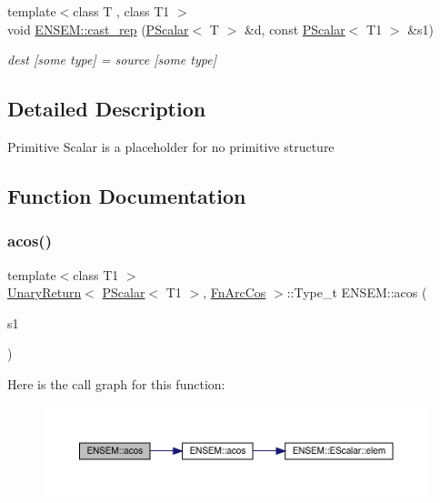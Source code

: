 \begin{DoxyCompactItemize}
{\footnotesize template$<$class T , class T1 $>$ }\\void \mbox{\hyperlink{group__primscalar_ga1444be24a3863d0af7a71b450500cb9d}{E\+N\+S\+E\+M\+::cast\+\_\+rep}} (\mbox{\hyperlink{classENSEM_1_1PScalar}{P\+Scalar}}$<$ T $>$ \&d, const \mbox{\hyperlink{classENSEM_1_1PScalar}{P\+Scalar}}$<$ T1 $>$ \&s1)
\begin{DoxyCompactList}\small\item\em dest \mbox{[}some type\mbox{]} = source \mbox{[}some type\mbox{]} \end{DoxyCompactList}\end{DoxyCompactItemize}


\subsection{Detailed Description}
Primitive Scalar is a placeholder for no primitive structure 

\subsection{Function Documentation}
\mbox{\label{group__primscalar_gac925d7a5363870efbfc14f80cbe15d63}} 
\subsubsection{\texorpdfstring{acos()}{acos()}}
{\footnotesize\ttfamily template$<$class T1 $>$ \\
\mbox{\hyperlink{structENSEM_1_1UnaryReturn}{Unary\+Return}}$<$ \mbox{\hyperlink{classENSEM_1_1PScalar}{P\+Scalar}}$<$ T1 $>$, \mbox{\hyperlink{structENSEM_1_1FnArcCos}{Fn\+Arc\+Cos}} $>$\+::Type\+\_\+t E\+N\+S\+E\+M\+::acos (\begin{DoxyParamCaption}\item[{const \mbox{\hyperlink{classENSEM_1_1PScalar}{P\+Scalar}}$<$ T1 $>$ \&}]{s1 }\end{DoxyParamCaption})\hspace{0.3cm}{\ttfamily [inline]}}

Here is the call graph for this function\+:\nopagebreak
\begin{figure}[H]
\begin{center}
\leavevmode
\includegraphics[width=350pt]{db/dcc/group__primscalar_gac925d7a5363870efbfc14f80cbe15d63_cgraph}
\end{center}
\end{figure}
\mbox{\label{group__primscalar_ga7014b73d255c4b57001dd68abf3a51c3}} 
